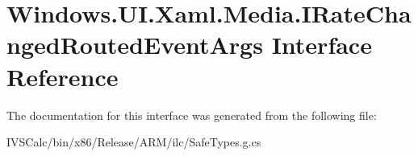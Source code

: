 \hypertarget{interface_windows_1_1_u_i_1_1_xaml_1_1_media_1_1_i_rate_changed_routed_event_args}{}\section{Windows.\+U\+I.\+Xaml.\+Media.\+I\+Rate\+Changed\+Routed\+Event\+Args Interface Reference}
\label{interface_windows_1_1_u_i_1_1_xaml_1_1_media_1_1_i_rate_changed_routed_event_args}


The documentation for this interface was generated from the following file\+:\begin{DoxyCompactItemize}
\item 
I\+V\+S\+Calc/bin/x86/\+Release/\+A\+R\+M/ilc/Safe\+Types.\+g.\+cs\end{DoxyCompactItemize}
